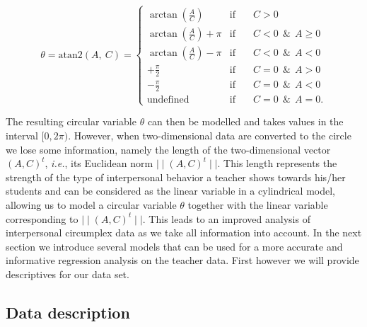 \documentclass[12pt,]{article}
\begin{document}
\begin{equation}\label{PredVal}
\theta          = \text{atan2}\left(A, \: C\right)  =
\left\{{\begin{array}{lcl}
                                                                       \arctan\left(\frac{A}{C}\right) & \text{if}  \quad&C > 0 \\
\arctan\left(\frac{A}{C}\right) + \pi & \text{if}  \quad& C  <  0  \:\: \&\:\: A \geq 0\\
 \arctan\left(\frac{A}{C}\right) - \pi & \text{if}  \quad&C  <  0 \:\:  \&\:\:A  < 0\\
 +\frac{\pi}{2} & \text{if}  \quad& C  =  0  \:\: \&\:\:A > 0\\
 -\frac{\pi}{2} & \text{if}  \quad& C =  0  \:\: \&\:\:A < 0\\
 \text{undefined} & \text{if} \quad& C =  0   \:\: \&\:\:A = 0.
 \end{array}}
\right.
\end{equation}

The resulting circular variable \(\theta\) can then be modelled and
takes values in the interval \([0, 2\pi)\). However, when
two-dimensional data are converted to the circle we lose some
information, namely the length of the two-dimensional vector
\((A, C)^t\), \emph{i.e.}, its Euclidean norm
\(\mid\mid (A, C)^t \mid\mid\). This length represents the strength of
the type of interpersonal behavior a teacher shows towards his/her
students and can be considered as the linear variable in a cylindrical
model, allowing us to model a circular variable \(\theta\) together with
the linear variable corresponding to \(\mid\mid (A, C)^t \mid\mid\).
This leads to an improved analysis of interpersonal circumplex data as
we take all information into account. In the next section we introduce
several models that can be used for a more accurate and informative
regression analysis on the teacher data. First however we will provide
descriptives for our data set.

\subsection{Data description}\label{DataDescriptives}
\end{document}

